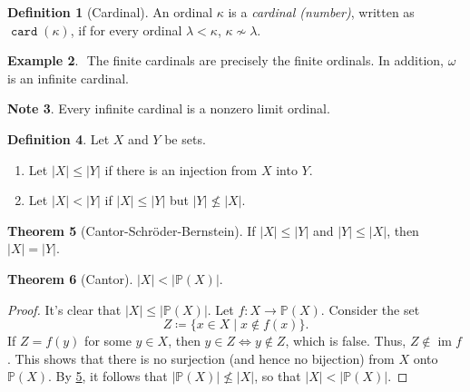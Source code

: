 \documentclass[10pt,letterpaper,cm]{nupset}
\theoremstyle{definition}
\newtheorem{definition}{Definition}[subsection]
\newtheorem{exmp}[definition]{Example}
\newtheorem{note}[definition]{Note}
\theoremstyle{theorem}
\newtheorem{theorem}[definition]{Theorem}
\theoremstyle{remark}
\renewcommand{\P}{\mathbb P}
\newcommand{\1}{\mathbf{1}}
\newcommand{\0}{\vec 0}
\DeclareMathOperator{\im}{im}
\DeclareMathOperator{\card}{\mathtt{card}}
\begin{document}
\begin{definition}[Cardinal]
 An ordinal $\kappa$ is a \textit{cardinal (number)}, written as $\card(\kappa)$, if for every ordinal $\lambda < \kappa$, $\kappa \not \sim \lambda$.
\end{definition}

\begin{exmp} $ $
The finite cardinals are precisely the finite ordinals. In addition, $\omega$ is an infinite cardinal.
\end{exmp}

\begin{note}
Every infinite cardinal is a nonzero limit ordinal. 
\end{note}

\begin{definition}
Let $X$ and $Y$ be sets. 
\begin{enumerate}
\item Let $\left\lvert{X}\right\rvert \leq \left\lvert{Y}\right\rvert$ if there is an injection from $X$ into $Y$. 
\item Let $\left\lvert{X}\right\rvert<\left\lvert{Y}\right\rvert$ if $\left\lvert{X}\right\rvert \leq \left\lvert{Y}\right\rvert$ but $\left\lvert{Y}\right\rvert \not \leq \left\lvert{X}\right\rvert$.
\end{enumerate}
\end{definition}

\begin{theorem}[Cantor-Schr\"oder-Bernstein]\label{CSB}
If $\left\lvert{X}\right\rvert\leq \left\lvert{Y}\right\rvert$ and $\left\lvert{Y}\right\rvert\leq \left\lvert{X}\right\rvert$, then $\left\lvert{X}\right\rvert = \left\lvert{Y}\right\rvert$.
\end{theorem}


\begin{theorem}[Cantor]
$\left\lvert{X}\right\rvert < \left\lvert{\P(X)}\right\rvert$.
\end{theorem}
\begin{proof}
It's clear that $\left\lvert{X}\right\rvert \leq \left\lvert{\P(X)}\right\rvert$. Let $f: X \to \P(X)$. Consider the set $$Z\coloneqq \{x\in X \mid x \notin f(x)    \} .$$ If $Z= f(y)$ for some $y\in X$, then $y\in Z \iff y\notin Z$, which is false. Thus, $Z\notin \im{f}$. This shows that there is no surjection (and hence no bijection) from $X$ onto $\P(X)$. By \cref{CSB}, it follows that   $\left\lvert{\P(X)}\right\rvert \not \leq \left\lvert{X}\right\rvert$, so that $\left\lvert{X}\right\rvert < \left\lvert{\P(X)}\right\rvert$.
\end{proof}
\end{document}
